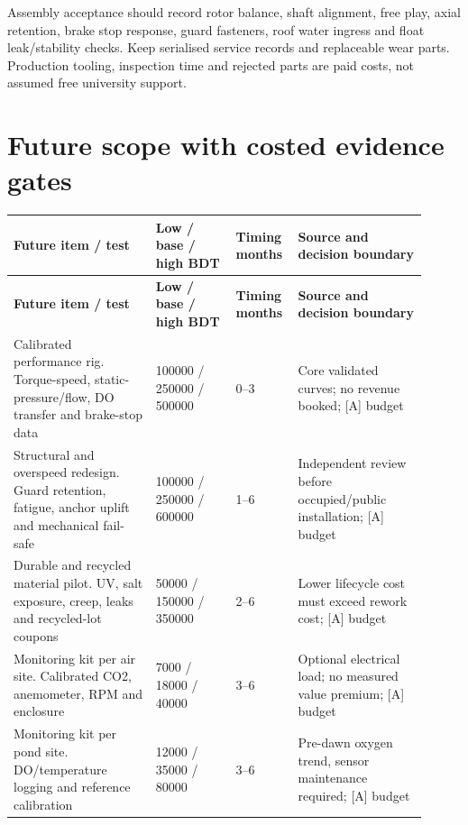 \documentclass[11pt,a4paper]{article}
\begin{document}
Assembly acceptance should record rotor balance, shaft alignment, free play, axial retention, brake stop response, guard fasteners, roof water ingress and float leak/stability checks. Keep serialised service records and replaceable wear parts. Production tooling, inspection time and rejected parts are paid costs, not assumed free university support.

\clearpage\section{Future scope with costed evidence gates}
{\footnotesize
\setlength{\tabcolsep}{3pt}\renewcommand{\arraystretch}{1.18}
\begin{longtable}{@{}>{\raggedright\arraybackslash}p{0.3207\linewidth}>{\raggedright\arraybackslash}p{0.1865\linewidth}>{\raggedright\arraybackslash}p{0.1044\linewidth}>{\raggedright\arraybackslash}p{0.2984\linewidth}@{}}
\toprule \textbf{Future item / test} & \textbf{Low / base / high BDT} & \textbf{Timing months} & \textbf{Source and decision boundary} \\ \midrule
\endfirsthead\toprule \textbf{Future item / test} & \textbf{Low / base / high BDT} & \textbf{Timing months} & \textbf{Source and decision boundary} \\ \midrule
\endhead\bottomrule\endfoot
Calibrated performance rig. Torque-speed, static-pressure/flow, DO transfer and brake-stop data & \num{100000} / \num{250000} / \num{500000} & \num{0}--\num{3} & Core validated curves; no revenue booked; [A] budget \cite{windguide,asce,clinic,faoaer} \\
Structural and overspeed redesign. Guard retention, fatigue, anchor uplift and mechanical fail-safe & \num{100000} / \num{250000} / \num{600000} & \num{1}--\num{6} & Independent review before occupied/public installation; [A] budget \cite{windguide,khk} \\
Durable and recycled material pilot. UV, salt exposure, creep, leaks and recycled-lot coupons & \num{50000} / \num{150000} / \num{350000} & \num{2}--\num{6} & Lower lifecycle cost must exceed rework cost; [A] budget \cite{materials,asa,recycle} \\
Monitoring kit per air site. Calibrated CO2, anemometer, RPM and enclosure & \num{7000} / \num{18000} / \num{40000} & \num{3}--\num{6} & Optional electrical load; no measured value premium; [A] budget \cite{whoweb,clinic} \\
Monitoring kit per pond site. DO/temperature logging and reference calibration & \num{12000} / \num{35000} / \num{80000} & \num{3}--\num{6} & Pre-dawn oxygen trend, sensor maintenance required; [A] budget \cite{faoquality,asce} \\

\end{longtable}}
\end{document}
